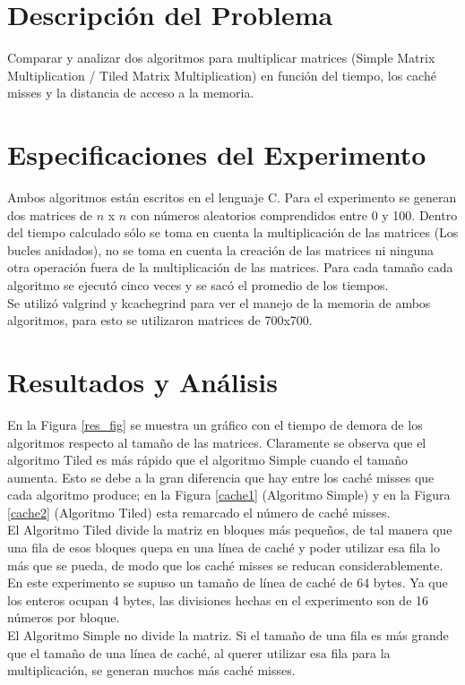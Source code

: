 \documentclass[a4paper,12pt]{article}
\begin{document}


\section{Descripción del Problema}

Comparar y analizar dos algoritmos para multiplicar matrices (Simple Matrix Multiplication / Tiled Matrix Multiplication)
en función del tiempo, los caché misses y la distancia de acceso a la memoria.

\section{Especificaciones del Experimento}

Ambos algoritmos están escritos en el lenguaje C. Para el experimento se generan dos matrices de $n$ x $n$ con números
aleatorios comprendidos entre 0 y 100. Dentro del tiempo calculado sólo se toma en cuenta la multiplicación
de las matrices (Los bucles anidados), no se toma en cuenta la creación de las matrices ni ninguna otra operación fuera
de la multiplicación de las matrices.
Para cada tamaño cada algoritmo se ejecutó cinco veces y se sacó el promedio de los tiempos. \\
Se utilizó valgrind y kcachegrind para ver el manejo de la memoria de ambos algoritmos, para esto se utilizaron matrices
de 700x700.

\section{Resultados y Análisis}

En la Figura \ref{res_fig} se muestra un gráfico con el tiempo de demora de los algoritmos respecto
al tamaño de las matrices. Claramente se observa que el algoritmo Tiled es más rápido que el algoritmo Simple cuando
el tamaño aumenta. Esto se debe a la gran diferencia que hay entre los caché misses que cada algoritmo produce; en
la Figura \ref{cache1} (Algoritmo Simple) y en la Figura \ref{cache2} (Algoritmo Tiled) esta remarcado el número de
caché misses. \\
El Algoritmo Tiled divide la matriz en bloques más pequeños, de tal manera que una fila de esos bloques quepa
en una línea de caché y poder utilizar esa fila lo más que se pueda, de modo que los caché misses se reducan considerablemente.
En este experimento se supuso un tamaño de línea de caché de 64 bytes. Ya que los enteros ocupan 4 bytes, las divisiones
hechas en el experimento son de 16 números por bloque. \\
El Algoritmo Simple no divide la matriz. Si el tamaño de una fila es más grande que el tamaño de una línea de caché,
al querer utilizar esa fila para la multiplicación, se generan muchos más caché misses.
\end{document}
